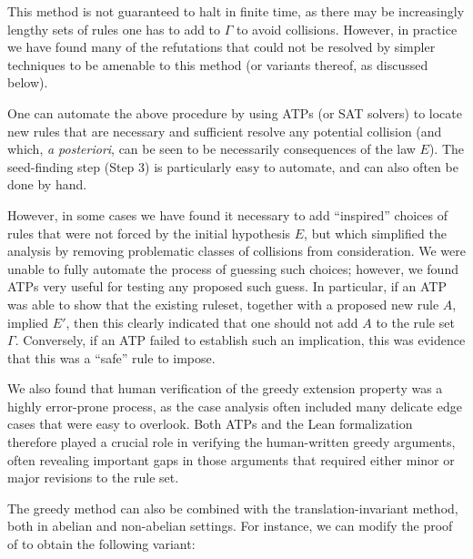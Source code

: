 This method is not guaranteed to halt in finite time, as there may be increasingly lengthy sets of rules one has to add to $\Gamma$ to avoid collisions.  However, in practice we have found many of the refutations that could not be resolved by simpler techniques to be amenable to this method (or variants thereof, as discussed below).

One can automate the above procedure by using ATPs (or SAT solvers) to locate new rules that are necessary and sufficient resolve any potential collision (and which, \emph{a posteriori}, can be seen to be necessarily consequences of the law $E$).  The seed-finding step (Step 3) is particularly easy to automate, and can also often be done by hand.  

However, in some cases we have found it necessary to add ``inspired'' choices of rules that were not forced by the initial hypothesis $E$, but which simplified the analysis by removing problematic classes of collisions from consideration.  We were unable to fully automate the process of guessing such choices; however, we found ATPs very useful for testing any proposed such guess.  In particular, if an ATP was able to show that the existing ruleset, together with a proposed new rule $A$, implied $E'$, then this clearly indicated that one should not add $A$ to the rule set $\Gamma$.  Conversely, if an ATP failed to establish such an implication, this was evidence that this was a ``safe'' rule to impose.

We also found that human verification of the greedy extension property was a highly error-prone process, as the case analysis often included many delicate edge cases that were easy to overlook.  Both ATPs and the Lean formalization therefore played a crucial role in verifying the human-written greedy arguments, often revealing important gaps in those arguments that required either minor or major revisions to the rule set.

The greedy method can also be combined with the translation-invariant method, both in abelian and non-abelian settings. For instance, we can modify the proof of  to obtain the following variant:

